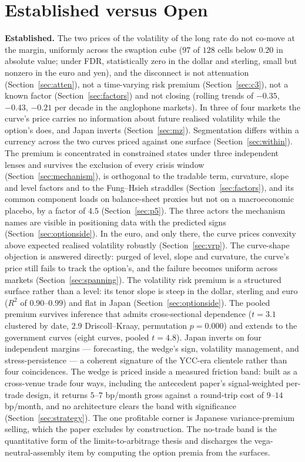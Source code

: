 \documentclass[11pt]{article}
\begin{document}
\section{Established versus Open}\label{sec:open}
\textbf{Established.} The two prices of the volatility of the long rate do not co-move at the
margin, uniformly across the swaption cube ($97$ of $128$ cells below $0.20$ in absolute value; under FDR, statistically zero in the dollar and sterling, small but nonzero in the euro and yen), and the disconnect is not attenuation
(Section~\ref{sec:atten}), not a time-varying risk premium (Section~\ref{sec:c3}), not a known
factor (Section~\ref{sec:factors}) and not closing (rolling trends of $-0.35$, $-0.43$, $-0.21$ per
decade in the anglophone markets). In three of four markets the curve's price carries no information
about future realised volatility while the option's does, and Japan inverts
(Section~\ref{sec:mz}). Segmentation differs within a currency across the two curves priced against
one surface (Section~\ref{sec:within}). The premium is concentrated in constrained states under
three independent lenses and survives the exclusion of every crisis window
(Section~\ref{sec:mechanism}), is orthogonal to the tradable term, curvature, slope and level
factors and to the Fung--Hsieh straddles (Section~\ref{sec:factors}), and its common component loads
on balance-sheet proxies but not on a macroeconomic placebo, by a factor of $4.5$
(Section~\ref{sec:p5}). The three actors the mechanism names are visible in positioning data with
the predicted signs (Section~\ref{sec:optionside}). In the euro, and only there, the curve prices
convexity above expected realised volatility robustly (Section~\ref{sec:vrp}). The curve-shape objection is answered directly: purged of level, slope and curvature, the curve's price still fails to track the option's, and the failure becomes uniform across markets (Section~\ref{sec:spanning}). The volatility risk premium is a structured surface rather than a level: its tenor slope is steep in the dollar, sterling and euro ($R^2$ of $0.90$--$0.99$) and flat in Japan (Section~\ref{sec:optionside}). The pooled premium survives inference that admits cross-sectional dependence ($t=3.1$ clustered by date, $2.9$ Driscoll--Kraay, permutation $p=0.000$) and extends to the government curves (eight curves, pooled $t=4.8$). Japan inverts on four
independent margins --- forecasting, the wedge's sign, volatility management, and stress-persistence
--- a coherent signature of the YCC-era clientele rather than four coincidences. The wedge is priced
inside a measured friction band: built as a cross-venue trade four ways, including the antecedent
paper's signal-weighted per-trade design, it returns $5$--$7$ bp/month gross against a round-trip cost
of $9$--$14$ bp/month, and no architecture clears the band with significance
(Section~\ref{sec:strategy}). The one profitable corner is Japanese variance-premium selling, which
the paper excludes by construction. The no-trade band is the quantitative form of the
limits-to-arbitrage thesis and discharges the vega-neutral-assembly item by computing the option
premia from the surfaces.
\end{document}
